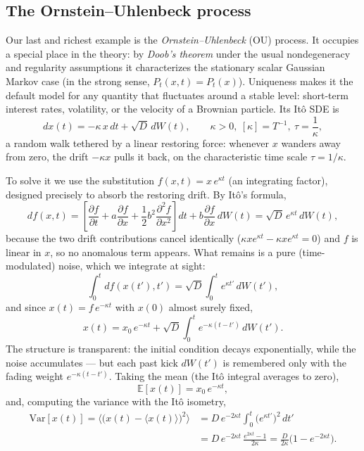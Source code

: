 \subsection{The Ornstein--Uhlenbeck process}

Our last and richest example is the \emph{Ornstein--Uhlenbeck} (OU) process.
It occupies a special place in the theory: by \emph{Doob's theorem}\cite{Doob1942,UhlenbeckOrnstein1930} under the usual nondegeneracy and regularity assumptions it characterizes the stationary scalar Gaussian Markov case (in the strong sense, $P_t(x,t)=P_t(x)$).
Uniqueness makes it the default model for any quantity that fluctuates around a stable level: short-term interest rates, volatility, or the velocity of a Brownian particle.
Its It\^o SDE is
\begin{equation}
dx(t) = -\kappa\,x\,dt + \sqrt{D}\,dW(t),\qquad \kappa>0,\ [\kappa]=T^{-1},\ \tau=\frac{1}{\kappa},
\end{equation}
a random walk tethered by a linear restoring force: whenever $x$ wanders away from zero, the drift $-\kappa x$ pulls it back, on the characteristic time scale $\tau=1/\kappa$.

To solve it we use the substitution $f(x,t)=x\,e^{\kappa t}$ (an integrating factor), designed precisely to absorb the restoring drift.
By It\^o's formula,
\begin{equation}
df(x,t) = \left[\frac{\partial f}{\partial t} + a\frac{\partial f}{\partial x} + \frac{1}{2}b^2\frac{\partial^2 f}{\partial x^2}\right]dt + b\frac{\partial f}{\partial x}\,dW(t) = \sqrt{D}\,e^{\kappa t}\,dW(t),
\end{equation}
because the two drift contributions cancel identically ($\kappa x e^{\kappa t} - \kappa x e^{\kappa t}=0$) and $f$ is linear in $x$, so no anomalous term appears.
What remains is a pure (time-modulated) noise, which we integrate at sight:
\begin{equation}
\int_0^t df(x(t'),t') = \sqrt{D}\int_0^t e^{\kappa t'}\,dW(t'),
\end{equation}
and since $x(t)=f\,e^{-\kappa t}$ with $x(0)$ almost surely fixed,
\begin{equation}
x(t) = x_0\,e^{-\kappa t} + \sqrt{D}\int_0^t e^{-\kappa(t-t')}\,dW(t').
\end{equation}
The structure is transparent: the initial condition decays exponentially, while the noise accumulates --- but each past kick $dW(t')$ is remembered only with the fading weight $e^{-\kappa(t-t')}$.
Taking the mean (the It\^o integral averages to zero),
\begin{equation}
\mathbb{E}[x(t)] = x_0\,e^{-\kappa t},
\end{equation}
and, computing the variance with the It\^o isometry,
\begin{equation}\begin{split}
\mathrm{Var}[x(t)] = \Big\langle\big(x(t)-\langle x(t)\rangle\big)^2\Big\rangle &= D\,e^{-2\kappa t}\int_0^t \big(e^{\kappa t'}\big)^2\,dt'\\
&= D\,e^{-2\kappa t}\,\frac{e^{2\kappa t}-1}{2\kappa} = \frac{D}{2\kappa}\big(1-e^{-2\kappa t}\big).
\end{split}\end{equation}

